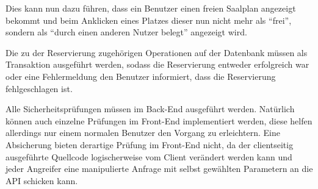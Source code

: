 Dies kann nun dazu führen, dass ein Benutzer einen freien Saalplan angezeigt bekommt und beim Anklicken eines Platzes dieser nun nicht mehr als \enquote{frei}, sondern als \enquote{durch einen anderen Nutzer belegt} angezeigt wird.

Die zu der Reservierung zugehörigen Operationen auf der Datenbank müssen als Transaktion ausgeführt werden, sodass die Reservierung entweder erfolgreich war oder eine Fehlermeldung den Benutzer informiert, dass die Reservierung fehlgeschlagen ist.

Alle Sicherheitsprüfungen müssen im Back-End ausgeführt werden.
Natürlich können auch einzelne Prüfungen im Front-End implementiert werden, diese helfen allerdings nur einem normalen Benutzer den Vorgang zu erleichtern.
Eine Absicherung bieten derartige Prüfung im Front-End nicht, da der clientseitig ausgeführte Quellcode logischerweise vom Client verändert werden kann und jeder Angreifer eine manipulierte Anfrage mit selbst gewählten Parametern an die API schicken kann.